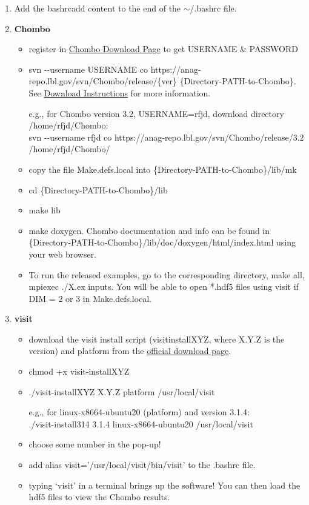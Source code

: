\documentclass{article}
\begin{document}
\begin{enumerate}[label=\textbf{\arabic*})]
\item Add the bashrcadd content to the end of the $\sim$\slash .bashrc file.
  
\item \textbf{Chombo}
  \begin{itemize}
  \item register in \href{https://commons.lbl.gov/display/chombo/Chombo+Download+Page}{Chombo Download Page} to get USERNAME \& PASSWORD
  \item svn -{}-username USERNAME co https:\slash \slash anag-repo.lbl.gov\slash svn\slash Chombo\slash release\slash \{ver\} \{Directory-PATH-to-Chombo\}. See \href{https://anag-repo.lbl.gov/chombo-3.2/access.html}{Download Instructions} for more information.

    e.g., for Chombo version 3.2, USERNAME=rfjd, download directory \slash home\slash rfjd\slash Chombo:\\svn -{}-username rfjd co https:\slash \slash anag-repo.lbl.gov\slash svn\slash Chombo\slash release\slash 3.2 \slash home\slash rfjd\slash Chombo\slash
  \item copy the file Make.defs.local into \{Directory-PATH-to-Chombo\}\slash lib\slash mk
  \item cd \{Directory-PATH-to-Chombo\}\slash lib
  \item make lib
  \item make doxygen. Chombo documentation and info can be found in \{Directory-PATH-to-Chombo\}\slash lib\slash doc\slash doxygen\slash html\slash index.html using your web browser.
  \item To run the released examples, go to the corresponding directory, make all, mpiexec .\slash X.ex inputs. You will be able to open *.hdf5 files using visit if DIM = 2 or 3 in Make.defs.local.
  \end{itemize}

\renewcommand{\_}{\texttt{\detokenize{_}}}
\item \textbf{visit}
  \begin{itemize}
  \item download the visit install script (visit\_installX\_Y\_Z, where X.Y.Z is the version) and platform from the \href{https://wci.llnl.gov/simulation/computer-codes/visit/executables}{official download page}.
  \item chmod +x visit-installX\_Y\_Z
  \item ./visit-installX\_Y\_Z X.Y.Z platform /usr/local/visit

  e.g., for linux-x86\_64-ubuntu20 (platform) and version 3.1.4:\\
  ./visit-install3\_1\_4 3.1.4 linux-x86\_64-ubuntu20 /usr/local/visit  
  \item choose some number in the pop-up!
  \item add {alias visit='/usr/local/visit/bin/visit'} to the .bashrc file.
  \item typing `visit' in a terminal brings up the software! You can then load the hdf5 files to view the Chombo results.
  \end{itemize}
  
\end{enumerate}
\end{document}

